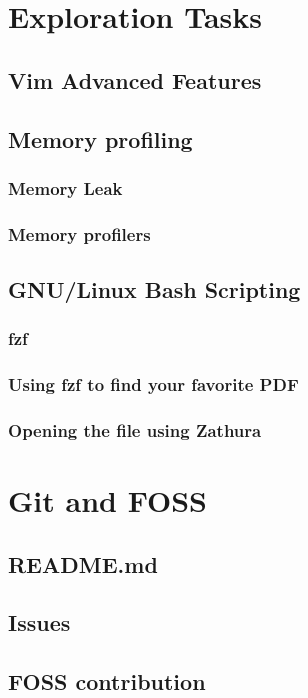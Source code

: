 \documentclass[12pt]{article}
\begin{document}
\section{Exploration Tasks}
    \subsection{Vim Advanced Features}
    
    \subsection{Memory profiling}
        \subsubsection{Memory Leak}
        \subsubsection{Memory profilers}

    \subsection{GNU/Linux Bash Scripting}
        \subsubsection{fzf}
        \subsubsection{Using fzf to find your favorite PDF}
        \subsubsection{Opening the file using Zathura}

\section{Git and FOSS}
    \subsection{README.md}
    \subsection{Issues}
    \subsection{FOSS contribution}
\end{document}
